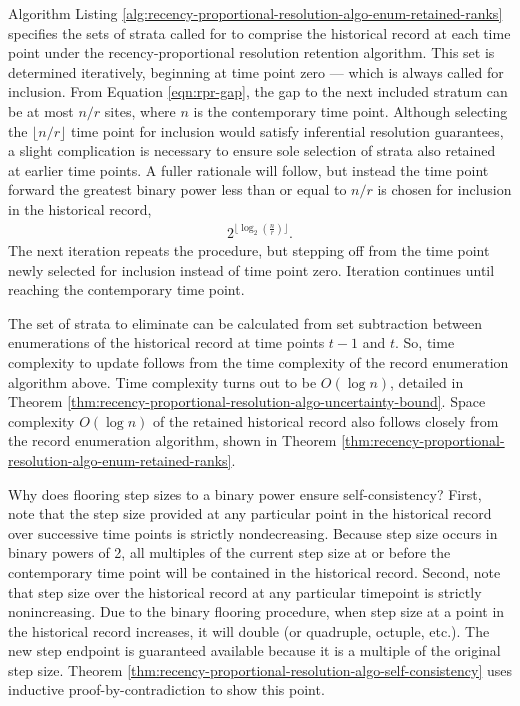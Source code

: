 Algorithm Listing \ref{alg:recency-proportional-resolution-algo-enum-retained-ranks} specifies the sets of strata called for to comprise the historical record at each time point under the recency-proportional resolution retention algorithm.
This set is determined iteratively, beginning at time point zero --- which is always called for inclusion.
From Equation \ref{eqn:rpr-gap}, the gap to the next included stratum can be at most $n/r$ sites, where $n$ is the contemporary time point.
Although selecting the $\lfloor n/r \rfloor$ time point for inclusion would satisfy inferential resolution guarantees, a slight complication is necessary to ensure sole selection of strata also retained at earlier time points.
A fuller rationale will follow, but instead the time point forward the greatest binary power less than or equal to $n/r$ is chosen for inclusion in the historical record,
\begin{align*}
  2^{\lfloor \log_{2}\left(\frac{n}{r}\right) \rfloor}.
\end{align*}
The next iteration repeats the procedure, but stepping off from the time point newly selected for inclusion instead of time point zero.
Iteration continues until reaching the contemporary time point.

The set of strata to eliminate can be calculated from set subtraction between enumerations of the historical record at time points $t-1$ and $t$.
So, time complexity to update follows from the time complexity of the record enumeration algorithm above.
Time complexity turns out to be $O(\log n)$, detailed in Theorem \ref{thm:recency-proportional-resolution-algo-uncertainty-bound}.
Space complexity $O(\log n)$ of the retained historical record also follows closely from the record enumeration algorithm, shown in Theorem \ref{thm:recency-proportional-resolution-algo-enum-retained-ranks}.

Why does flooring step sizes to a binary power ensure self-consistency?
First, note that the step size provided at any particular point in the historical record over successive time points is strictly nondecreasing.
Because step size occurs in binary powers of 2, all multiples of the current step size at or before the contemporary time point will be contained in the historical record.
Second, note that step size over the historical record at any particular timepoint is strictly nonincreasing.
Due to the binary flooring procedure, when step size at a point in the historical record increases, it will double (or quadruple, octuple, etc.).
The new step endpoint is guaranteed available because it is a multiple of the original step size.
Theorem \ref{thm:recency-proportional-resolution-algo-self-consistency} uses inductive proof-by-contradiction to show this point.









